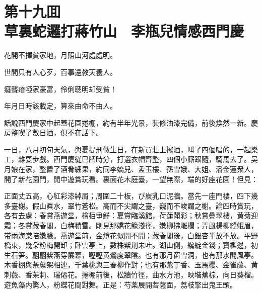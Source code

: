 
\chapter*{第十九囬　\\草裏蛇邏打蔣竹山　李瓶兒情感西門慶}


\begin{myquote}
花開不擇貧家地，月照山河處處明。

世間只有人心歹，百事還教天養人。

癡聾瘖啞家豪富，伶俐聰明却受貧！

年月日時該載定，算來由命不由人。
\end{myquote}

話說西門慶家中起蓋花園捲棚，約有半年光景，裝修油漆完備，前後煥然一新。慶房整喫了數日酒，俱不在話下。

一日，八月初旬天氣，與夏提刑做生日，在新買莊上擺酒，叫了四個唱的，一起樂工，雜耍步戲。西門慶従巳牌時分，打選衣帽齊整，四個小廝跟隨，騎馬去了。吴月娘在家，整置了酒肴細果，約同李嬌兒、孟玉樓、孫雪娥、大姐、潘金蓮衆人，開了新花園門，閒中遊賞玩看。裏面花木庭臺，一望無際，端的好座花園！但見：

\begin{myquote}
正面丈五高，心紅彩漆綽屑；周圍二十板，ぴ炭乳口泥牆。當先一座門樓，四下幾多臺榭。假山眞水，翠竹蒼松。高而不尖謂之臺，巍而不峻謂之榭。論四時賞玩，各有去處：春賞燕遊堂，檜栢爭鮮：夏賞臨溪館，荷蓮鬦彩；秋賞疊翠樓，黄菊迎霜；冬賞藏春閣，白梅積雪。剛見那嬌花籠淺徑，嫩柳拂雕欄；弄風楊柳縱蛾眉，带雨海棠陪嫩臉。燕遊堂前，金燈花似開不開；藏春閣後，白銀杏半放不放。平野橋東，幾朵粉梅開卸；卧雲亭上，數株紫荆未吐。湖山側，纔綻金錢；寳檻邊，初生石笋。翩翩紫燕穿簾幕，嚦嚦黄鶯度翠陰。也有那月窗雪洞，也有那水閣風亭。木香棚與荼䕷架相連，千葉桃與三春柳作對；也有那紫丁香、玉馬櫻、金雀藤、黄刺薇、香茉莉、瑞僊花。捲棚前後，松牆竹徑，曲水方池，映堦蕉棕，向日葵榴。遊魚藻内驚人，粉蝶花間對舞。正是：芍薬展開菩薩面，荔枝擎出鬼王頭。
\end{myquote}

